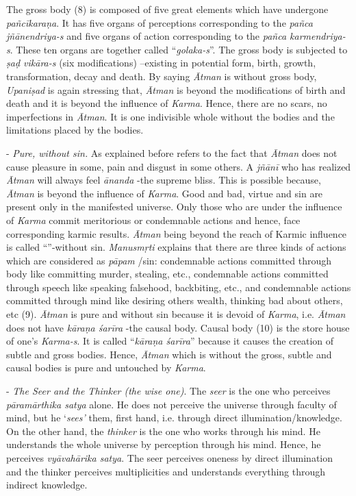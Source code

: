 The gross body (8) is composed of five great elements which have undergone \emph{pañcīkaraṇa}. It has five organs of perceptions corresponding to the \emph{pañca jñānendriya-s} and five organs of action corresponding to the \emph{pañca karmendriya-s}. These ten organs are together called ``\emph{golaka-s}''. The gross body is subjected to \emph{ṣaḍ vikāra-s} (six modifications) --existing in potential form, birth, growth, transformation, decay and death. By saying \emph{Ātman} is without gross body, \emph{Upaniṣad} is again stressing that, \emph{Ātman} is beyond the modifications of birth and death and it is beyond the influence of \emph{Karma}. Hence, there are no scars, no imperfections in \emph{Ātman}. It is one indivisible whole without the bodies and the limitations placed by the bodies.

- \emph{Pure, without sin.} As explained before  refers to the fact that \emph{Ātman} does not cause pleasure in some, pain and disgust in some others. A \emph{jñānī} who has realized \emph{Ātman} will always feel \emph{ānanda} -the supreme bliss. This is possible because, \emph{Ātman} is beyond the influence of \emph{Karma}. Good and bad, virtue and sin are present only in the manifested universe. Only those who are under the influence of \emph{Karma} commit meritorious or condemnable actions and hence, face corresponding karmic results. \emph{Ātman} being beyond the reach of Karmic influence is called ``''-without sin. \emph{Manusmṛti} explains that there are three kinds of actions which are considered as \emph{pāpam} /sin: condemnable actions committed through body like committing murder, stealing, etc., condemnable actions committed through speech like speaking falsehood, backbiting, etc., and condemnable actions committed through mind like desiring others wealth, thinking bad about others, etc (9). \emph{Ātman} is pure and without sin because it is devoid of \emph{Karma}, i.e. \emph{Ātman} does not have \emph{kāraṇa śarīra} -the causal body. Causal body (10) is the store house of one's \emph{Karma-s}. It is called ``\emph{kāraṇa śarīra}'' because it causes the creation of subtle and gross bodies. Hence, \emph{Ātman} which is without the gross, subtle and causal bodies is pure and untouched by \emph{Karma}.

 - \emph{The Seer and the Thinker (the wise one)}. The \emph{seer} is the one who perceives \emph{pāramārthika satya} alone. He does not perceive the universe through faculty of mind, but he `\emph{sees'} them, first hand, i.e. through direct illumination/knowledge. On the other hand, the \emph{thinker} is the one who works through his mind. He understands the whole universe by perception through his mind. Hence, he perceives \emph{vyāvahārika satya}. The seer perceives oneness by direct illumination and the thinker perceives multiplicities and understands everything through indirect knowledge.

